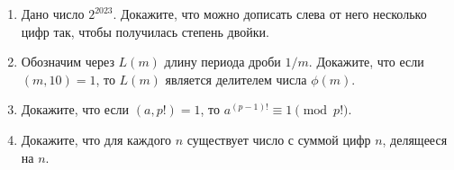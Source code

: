 \documentclass{article}
\begin{document}
\begin{enumerate}[label*=\protect\fbox{\arabic{enumi}}]
\item Дано число $2^{2023}$. Докажите, что можно дописать слева от него несколько цифр так, чтобы получилась степень двойки.

\item Обозначим через  $L(m)$  длину периода дроби $1/m$. Докажите, что если  $(m, 10) = 1$,  то  $L(m)$  является делителем числа $\phi(m)$.

\item Докажите, что если $(a, p!) = 1$, то $a^{(p-1)!} \equiv 1 \pmod{p!}$.

\item Докажите, что для каждого $n$ существует число с суммой цифр $n$, делящееся на $n$.

\end{enumerate}
\end{document}
